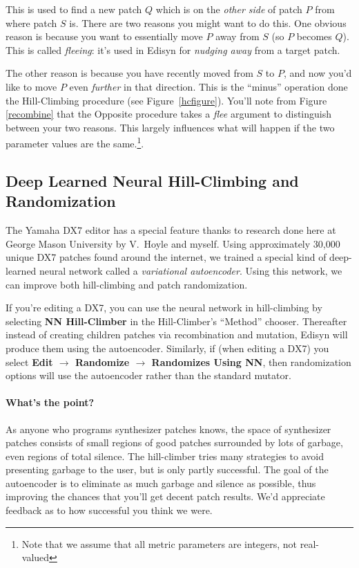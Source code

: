 \documentclass{article}
\begin{document}
{%
\vspace{1em}\quad
This is used to find a new patch \(Q\) which is on the {\it other side} of patch \(P\) from where patch \(S\) is.  There are two reasons you might want to do this.  One obvious reason is because you want to essentially move \(P\) away from \(S\) (so \(P\) becomes \(Q\)).  This is called {\it fleeing}: it's used in Edisyn for {\it nudging away} from a target patch.

The other reason is because you have recently moved from \(S\) to \(P\), and now you'd like to move \(P\) even {\it further} in that direction.  This is the ``minus'' operation  done the Hill-Climbing procedure (see Figure~\ref{hcfigure}).  You'll note from Figure \ref{recombine} that the Opposite procedure takes a {\it flee} argument to distinguish between your two reasons.   This largely influences what will happen if the two parameter values are the same.\footnote{Note that we assume that all metric parameters are integers, not real-valued}.
}

\subsection{Deep Learned Neural Hill-Climbing and Randomization}

The Yamaha DX7 editor has a special feature thanks to research done here at George Mason University by V.~Hoyle and myself.  Using approximately 30,000 unique DX7 patches found around the internet, we trained a special kind of deep-learned neural network called a {\it variational autoencoder}.  Using this network, we can improve both hill-climbing and patch randomization.

If you're editing a DX7, you can use the neural network in hill-climbing by selecting {\bf NN Hill-Climber} in the Hill-Climber's ``Method'' chooser.  Thereafter instead of creating children patches via recombination and mutation, Edisyn will produce them using the autoencoder.  Similarly, if (when editing a DX7) you select {\bf Edit \(\rightarrow\) Randomize \(\rightarrow\) Randomizes Using NN}, then randomization options will use the autoencoder rather than the standard mutator.

\paragraph{What's the point?}  As anyone who programs synthesizer patches knows, the space of synthesizer patches consists of small regions of good patches surrounded by lots of garbage, even regions of total silence.  The hill-climber tries many strategies to avoid presenting garbage to the user, but is only partly successful.   The goal of the autoencoder is to eliminate as much garbage and silence as possible, thus improving the chances that you'll get decent patch results.  We'd appreciate feedback as to how successful you think we were.
 
\end{document}
